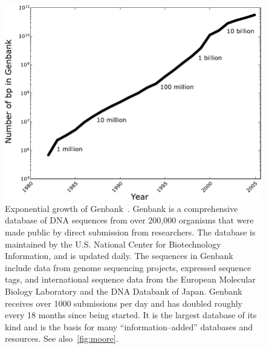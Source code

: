            \begin{figure}[ptb]
            \centering
            \includegraphics[width=\textwidth]{Body/Images-chap1/genbank.pdf}
            \caption[Exponential growth of Genbank]{Exponential
            growth of Genbank~\cite{benson2006genbank}.  Genbank is
            a comprehensive database of DNA sequences from over 200,000
            organisms that were made public by direct
            submission from researchers.  The database is maintained
            by the U.S. National Center for Biotechnology Information, and is updated daily.  The sequences in Genbank
            include data from genome sequencing projects, expressed
            sequence tags, and international sequence data from the
            European Molecular Biology Laboratory and the DNA
            Databank of Japan.  Genbank receives over 1000
            submissions per day and has doubled roughly every 18
            months since being started.  It is the largest database
            of its kind and is the basis for many
            ``information--added'' databases and resources.
            See also~\vref{fig:moore}.
        }
            \label{fig:genbank}
            \end{figure}


